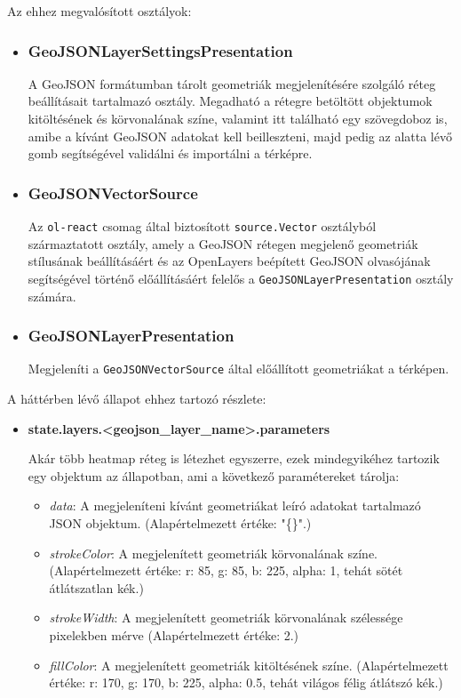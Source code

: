 \noindent Az ehhez megvalósított osztályok:
\begin{itemize}

\item\subsubsection{GeoJSONLayerSettingsPresentation}
A GeoJSON formátumban tárolt geometriák megjelenítésére szolgáló réteg
beállításait tartalmazó osztály. Megadható a rétegre betöltött objektumok
kitöltésének és körvonalának színe, valamint itt található egy szövegdoboz is,
amibe a kívánt GeoJSON adatokat kell beilleszteni, majd pedig az alatta lévő
gomb segítségével validálni és importálni a térképre.

\item\subsubsection{GeoJSONVectorSource}
Az \verb|ol-react| csomag által biztosított \verb|source.Vector| osztályból
származtatott osztály, amely a GeoJSON rétegen megjelenő geometriák stílusának
beállításáért és az OpenLayers beépített GeoJSON olvasójának segítségével
történő előállításáért felelős a \verb|GeoJSONLayerPresentation| osztály
számára.

\item\subsubsection{GeoJSONLayerPresentation}
Megjeleníti a \verb|GeoJSONVectorSource| által előállított geometriákat a
térképen.

\end{itemize}
\noindent A háttérben lévő állapot ehhez tartozó részlete:
\begin{itemize}

  \item \textbf{state.layers.<geojson\_layer\_name>.parameters}

  Akár több heatmap réteg is létezhet egyszerre, ezek mindegyikéhez tartozik egy
  objektum az állapotban, ami a következő paramétereket tárolja:

  \begin{itemize}
  \item \textit{data}:
    A megjeleníteni kívánt geometriákat leíró adatokat tartalmazó JSON
    objektum.
    (Alapértelmezett értéke: "\{\}".)
  \item \textit{strokeColor}:
    A megjelenített geometriák körvonalának színe.
    (Alapértelmezett értéke: {r: 85, g: 85, b: 225, alpha: 1}, tehát sötét
    átlátszatlan kék.)
  \item \textit{strokeWidth}:
    A megjelenített geometriák körvonalának szélessége pixelekben mérve
    (Alapértelmezett értéke: 2.)
  \item \textit{fillColor}:
    A megjelenített geometriák kitöltésének színe.
    (Alapértelmezett értéke: {r: 170, g: 170, b: 225, alpha: 0.5}, tehát világos
    félig átlátszó kék.)
  \end{itemize}

\end{itemize}

